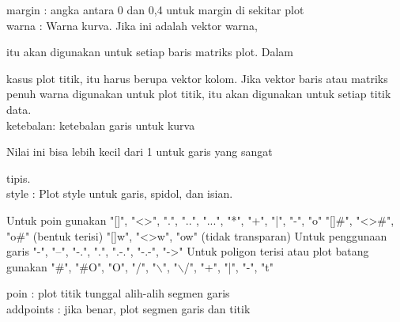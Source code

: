 \documentclass{article}
\begin{document}
\begin{eulernotebook}
\begin{eulercomment}
\begin{eulercomment}
\begin{eulercomment}
\begin{eulercomment}
\begin{eulercomment}
\begin{eulercomment}
\begin{eulercomment}
\begin{eulercomment}
\begin{eulercomment}
\begin{eulercomment}
\begin{eulercomment}
\begin{eulercomment}
\begin{eulercomment}
\begin{eulercomment}
\begin{eulercomment}
\begin{eulercomment}
\begin{eulercomment}
\begin{eulercomment}
\begin{eulercomment}
\begin{eulercomment}
\begin{eulercomment}
\begin{eulercomment}
\begin{eulercomment}
\begin{eulercomment}
\begin{eulercomment}
\begin{eulercomment}
\begin{eulercomment}
\begin{eulercomment}
\begin{eulercomment}
margin       : angka antara 0 dan 0,4 untuk margin di sekitar plot\\
warna        : Warna kurva. Jika ini adalah vektor warna,\\
\end{eulercomment}
\begin{eulerttcomment}
            itu akan digunakan untuk setiap baris matriks plot. Dalam
\end{eulerttcomment}
\begin{eulercomment}
kasus plot titik, itu harus berupa vektor kolom. Jika vektor baris
atau matriks penuh warna digunakan untuk plot titik, itu akan
digunakan untuk setiap titik data.\\
ketebalan: ketebalan garis untuk kurva\\
\end{eulercomment}
\begin{eulerttcomment}
            Nilai ini bisa lebih kecil dari 1 untuk garis yang sangat
\end{eulerttcomment}
\begin{eulercomment}
tipis.\\
style        : Plot style untuk garis, spidol, dan isian.\\
\end{eulercomment}
\begin{eulerttcomment}
            Untuk poin gunakan
            "[]", "<>", ".", "..", "...",
            "*", "+", "|", "-", "o"
            "[]#", "<>#", "o#" (bentuk terisi)
            "[]w", "<>w", "ow" (tidak transparan)
            Untuk penggunaan garis
            "-", "--", "-.", ".", ".-.", "-.-", "->"
            Untuk poligon terisi atau plot batang gunakan
            "#", "#O", "O", "/", "\(\backslash\)", "\(\backslash\)/",
            "+", "|", "-", "t"
\end{eulerttcomment}
\begin{eulercomment}
poin         : plot titik tunggal alih-alih segmen garis\\
addpoints    : jika benar, plot segmen garis dan titik\\

\end{eulercomment}
\end{eulercomment}
\end{eulercomment}
\end{eulercomment}
\end{eulercomment}
\end{eulercomment}
\end{eulercomment}
\end{eulercomment}
\end{eulercomment}
\end{eulercomment}
\end{eulercomment}
\end{eulercomment}
\end{eulercomment}
\end{eulercomment}
\end{eulercomment}
\end{eulercomment}
\end{eulercomment}
\end{eulercomment}
\end{eulercomment}
\end{eulercomment}
\end{eulercomment}
\end{eulercomment}
\end{eulercomment}
\end{eulercomment}
\end{eulercomment}
\end{eulercomment}
\end{eulercomment}
\end{eulercomment}
\end{eulercomment}
\end{eulernotebook}
\end{document}
